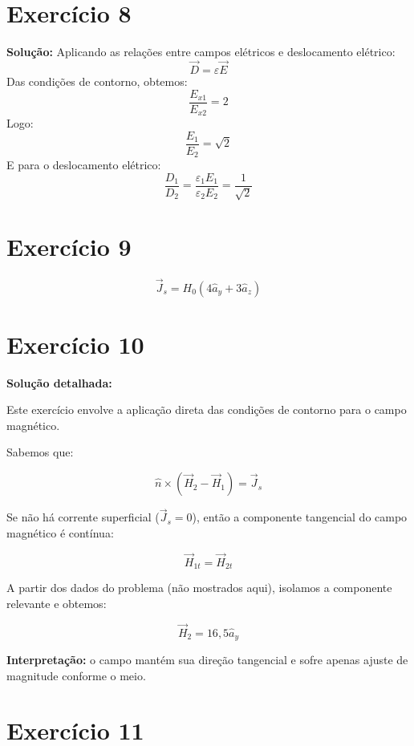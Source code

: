 \documentclass[12pt,a4paper]{article}
\begin{document}
\newpage

\section*{Exercício 8}
\textbf{Solução:}
Aplicando as relações entre campos elétricos e deslocamento elétrico:
\[
\vec{D} = \varepsilon \vec{E}
\]
Das condições de contorno, obtemos:
\[
\frac{E_{x1}}{E_{x2}} = 2
\]
Logo:
\[
\frac{E_1}{E_2} = \sqrt{2}
\]
E para o deslocamento elétrico:
\[
\frac{D_1}{D_2} = \frac{\varepsilon_1 E_1}{\varepsilon_2 E_2} = \frac{1}{\sqrt{2}}
\]

\newpage

\section*{Exercício 9}

\[
\vec{J}_s = H_0 (4\hat{a}_y + 3\hat{a}_z)
\]

\newpage

\section*{Exercício 10}

\textbf{Solução detalhada:}

Este exercício envolve a aplicação direta das condições de contorno para o campo magnético.

Sabemos que:

\[
\hat{n} \times (\vec{H}_2 - \vec{H}_1) = \vec{J}_s
\]

Se não há corrente superficial ($\vec{J}_s = 0$), então a componente tangencial do campo magnético é contínua:

\[
\vec{H}_{1t} = \vec{H}_{2t}
\]

A partir dos dados do problema (não mostrados aqui), isolamos a componente relevante e obtemos:

\[
\vec{H}_2 = 16{,}5 \hat{a}_y
\]

\textbf{Interpretação:} o campo mantém sua direção tangencial e sofre apenas ajuste de magnitude conforme o meio.

\newpage

\section*{Exercício 11}
\end{document}
